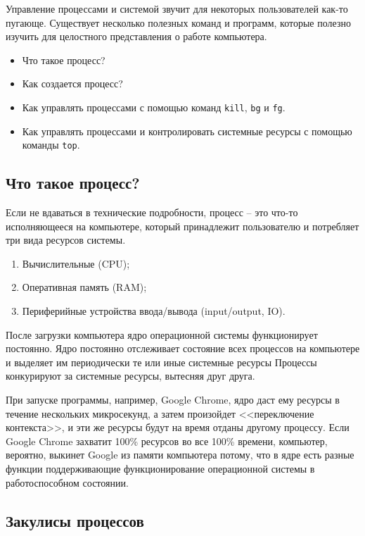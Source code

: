 \documentclass[a4paper,12pt,final,openany]{extbook}
\providecommand{\tightlist}{%
  \setlength{\itemsep}{0pt}\setlength{\parskip}{0pt}}
\begin{document}
Управление процессами и системой звучит для некоторых пользователей как-то пугающе.
Существует несколько полезных команд и программ,
которые полезно изучить для целостного представления о работе компьютера.
\begin{itemize}
\tightlist
\item
  Что такое процесс?
\item
  Как создается процесс?
\item
  Как управлять процессами с помощью команд \texttt{kill}, \texttt{bg} и \texttt{fg}.
\item
  Как управлять процессами и контролировать системные ресурсы с помощью
  команды \texttt{top}.
\end{itemize}

\hypertarget{What-is-a-Process}{%
\subsection{\texorpdfstring{\protect\hyperlink{What-is-a-Process}{}Что
такое процесс?}{Что такое процесс?}}\label{What-is-a-Process}}

Если не вдаваться в технические подробности, процесс -- это что-то
исполняющееся на компьютере, который принадлежит пользователю и
потребляет три вида ресурсов системы.
\begin{enumerate}
\tightlist
\item
  Вычислительные (CPU);
\item
  Оперативная память (RAM);
\item
  Периферийные устройства ввода/вывода (input/output, IO).
\end{enumerate}

После загрузки компьютера ядро операционной системы функционирует
постоянно. Ядро постоянно отслеживает состояние всех процессов на компьютере и выделяет им периодически те или иные системные ресурсы
Процессы конкурируют за системные ресурсы, вытесняя друг друга.

При запуске программы, например, Google Chrome, ядро даст ему
ресурсы в течение нескольких микросекунд, а затем произойдет
<<переключение контекста>>, и эти же ресурсы будут на время отданы
другому процессу. Если Google Chrome захватит 100\% ресурсов во все
100\% времени, компьютер, вероятно, выкинет Google из памяти компьютера
потому, что в ядре есть разные функции поддерживающие функционирование
операционной системы в работоспособном состоянии.

\hypertarget{Processes-Behind-the-Scenes}{%
\subsection{\texorpdfstring{\protect\hyperlink{Processes-Behind-the-Scenes}{}Закулисы
процессов}{Закулисы процессов}}\label{Processes-Behind-the-Scenes}}
\end{document}
